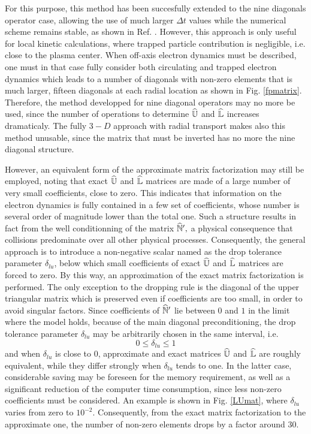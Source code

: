 For this purpose, this method has been succesfully extended to the nine
diagonals operator case, allowing the use of much larger $\Delta t$ values
while the numerical scheme remains stable, as shown in Ref. \cite{pey98}.
However, this approach is only useful for local kinetic calculations, where
trapped particle contribution is negligible, i.e. close to the plasma
center. When off-axis electron dynamics must be described, one must in that
case fully consider both circulating and trapped electron dynamics which
leads to a number of diagonals with non-zero elements that is much larger,
fifteen diagonals at each radial location as shown in Fig. \ref{fpmatrix}.
Therefore, the method developped for nine diagonal operators may no more be
used, since the number of operations to determine $\widehat{\Bbb{U}}$ and $%
\widehat{\Bbb{L}}$ increases dramaticaly. The fully $3-D$ approach with
radial transport makes also this method unusable, since the matrix that must
be inverted has no more the nine diagonal structure.

However, an equivalent form of the approximate matrix factorization may
still be employed, noting that exact $\widehat{\Bbb{U}}$ and $\widehat{\Bbb{L%
}}$ matrices are made of a large number of very small coefficients, close to
zero. This indicates that information on the electron dynamics is fully
contained in a few set of coefficients, whose number is several order of
magnitude lower than the total one. Such a structure results in fact from
the well conditionning of the matrix $\widehat{\Bbb{N}}^{\prime },$ a
physical consequence that collisions predominate over all other physical
processes. Consequently, the general approach is to introduce a non-negative
scalar named as the drop tolerance parameter $\delta _{lu}$, below which
small coefficients of exact $\widehat{\Bbb{U}}$ and $\widehat{\Bbb{L}}$
matrices are forced to zero. By this way, an approximation of the exact
matrix factorization is performed. The only exception to the dropping rule
is the diagonal of the upper triangular matrix which is preserved even if
coefficients are too small, in order to avoid singular factors. Since
coefficients of $\widehat{\Bbb{N}}^{\prime }$ lie between $0$ and $1$ in the
limit where the model holds, because of the main diagonal preconditioning,
the drop tolerance parameter $\delta _{lu}$ may be arbitrarily chosen in the
same interval, i.e.
\begin{equation}
0\leq \delta _{lu}\leq 1
\end{equation}
and when $\delta _{lu}$ is close to $0$, approximate and exact matrices $%
\widehat{\Bbb{U}}$ and $\widehat{\Bbb{L}}$ are roughly equivalent, while
they differ strongly when $\delta _{lu}$ tends to one. In the latter case,
considerable saving may be foreseen for the memory requirement, as well as a
significant reduction of the computer time consumption, since less non-zero
coefficients must be considered. An example is shown in Fig. \ref{LUmat},
where $\delta _{lu}$ varies from zero to $10^{-2}.$ Consequently, from the
exact matrix factorization to the approximate one, the number of non-zero
elements drops by a factor around $30$.

